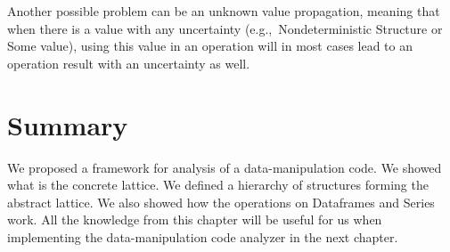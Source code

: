Another possible problem can be an unknown value propagation, meaning that when there is a value with any uncertainty
(e.g.,\ Nondeterministic Structure or Some value), using this value in an operation will in most cases lead to an
operation result with an uncertainty as well.

\section*{Summary}

We proposed a framework for analysis of a data-manipulation code.
We showed what is the concrete lattice.
We defined a hierarchy of structures forming the abstract lattice.
We also showed how the operations on Dataframes and Series work.
All the knowledge from this chapter will be useful for us when implementing the data-manipulation code analyzer
in the next chapter.
